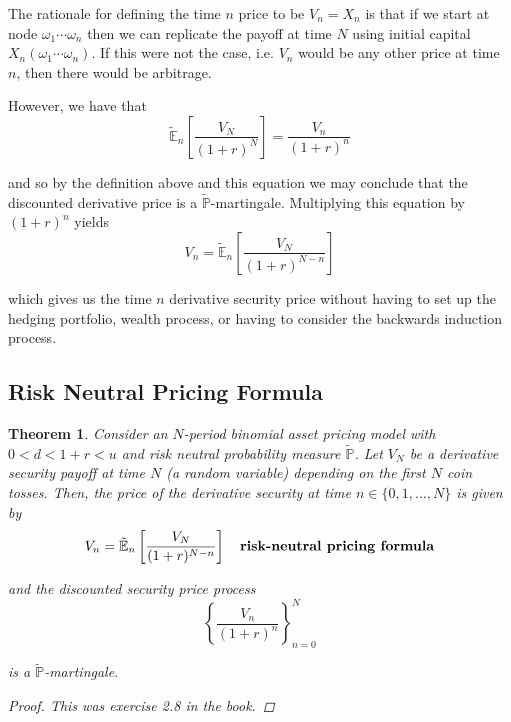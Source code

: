 \documentclass[12pt]{article}
\newtheorem{theorem}{Theorem}
\newlength\tindent
\renewcommand{\indent}{\hspace*{\tindent}}
\renewcommand{\P}{\mathbb P}
\newcommand{\E}{\mathbb E}
\begin{document}
\indent The rationale for defining the time $n$ price to be $V_n = X_n$ is that if we start at node $\omega_1\cdots\omega_n$ then we can replicate the payoff at time $N$ using initial capital $X_n(\omega_1\cdots\omega_n)$. If this were not the case, i.e. $V_n$ would be any other price at time $n$, then there would be arbitrage.

However, we have that
\begin{equation*}
	\tilde{\E}_n \left[ \frac{V_N}{(1 + r)^N} \right] = \frac{V_n}{(1 + r)^n}
\end{equation*}

and so by the definition above and this equation we may conclude that the discounted derivative price is a $\tilde{\P}$-martingale. Multiplying this equation by $(1 + r)^n$ yields
\begin{equation*}
	V_n = \tilde{\E}_n \left[ \frac{V_N}{(1 + r)^{N - n}} \right]
\end{equation*}

which gives us the time $n$ derivative security price without having to set up the hedging portfolio, wealth process, or having to consider the backwards induction process.

\subsection{Risk Neutral Pricing Formula}

\begin{theorem} Consider an $N$-period binomial asset pricing model with $0 < d < 1 + r < u$ and risk neutral probability measure $\tilde{\P}$. Let $V_N$ be a derivative security payoff at time $N$ (a random variable) depending on the first $N$ coin tosses. Then, the price of the derivative security at time $n \in \{0, 1,..., N\}$ is given by
\begin{equation*}
	V_n = \tilde{\E}_n \left[ \frac{V_N}{(1 + r)^{N - n}} \right] \quad \text{\bf risk-neutral pricing formula}
\end{equation*}

and the discounted security price process
\begin{equation*}
	\left\{ \frac{V_n}{(1 + r)^n} \right\}^N_{n = 0}
\end{equation*}

is a $\tilde{\P}$-martingale.
\begin{proof} {\em This was exercise 2.8 in the book.}
\end{proof}
\end{theorem}
\end{document}
